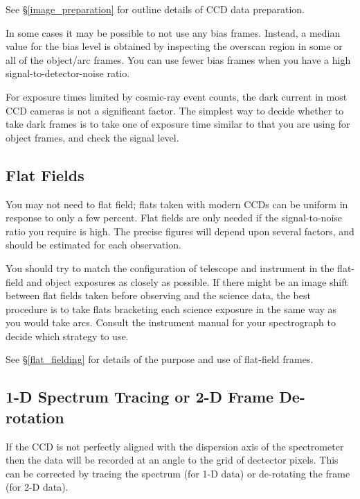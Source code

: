 \documentclass[twoside,11pt]{article}
\newcommand{\htmlref}[2]{#1}
\newcommand{\xlabel}[1]{}
\newcommand{\mlabel}[1]{\xlabel{#1}\label{#1}}
\newcommand{\scspec}[2]{#1}
\newcommand{\scspec}[2]{#2}
\begin{document}
See \scspec{\S\ref{image_preparation}}
{\htmlref{{\sl Image Preparation}}{image_preparation}}
for outline details of CCD data preparation.

In some cases it may be possible to not use any
\htmlref{bias frames}{gl_bias_frame}.  Instead,
a median value for the bias level is obtained by inspecting the
\htmlref{overscan region}{gl_overscan} in some or all of the
object/arc frames.
You can use fewer bias frames when you have a high
signal-to-detector-noise ratio.

For exposure times limited by \htmlref{cosmic-ray event}{gl_cosmic_ray}
counts, the \htmlref{dark current}{gl_dark_current} in most CCD cameras
is not a significant factor.
The simplest way to decide whether to take dark frames is to take one
of exposure time similar to that you are using for object frames, and
check the signal level.


\subsection{\mlabel{flat_intro}Flat Fields}

You may not need to \htmlref{flat field}{gl_flat_field};
flats taken with modern \htmlref{CCDs}{gl_ccd} can be
uniform in response to only a few percent.
Flat fields are only needed if the signal-to-noise ratio
you require is high.
The precise figures will depend upon several factors,
and should be estimated for each observation.

You should try to match the configuration of telescope and instrument
in the flat-field and object exposures as closely as possible.
If there might be an image shift between flat fields taken before
observing and the science data, the best procedure is to take flats
\htmlref{bracketing}{gl_bracket} each science exposure in the same
way as you would take arcs.  Consult the instrument manual for your
\htmlref{spectrograph}{gl_spectrograph} to decide which strategy
to use.

See \scspec{\S\ref{flat_fielding}}
{\htmlref{Flat Fielding}{flat_fielding}} for details of
the purpose and use of flat-field frames.


\subsection{1-D Spectrum Tracing or 2-D Frame De-rotation}

If the CCD is not perfectly aligned with the dispersion axis of the
spectrometer then the data will be recorded at an angle to the grid of
dectector pixels. This can be corrected by tracing the spectrum (for
1-D data) or de-rotating the frame (for 2-D data).
\end{document}
